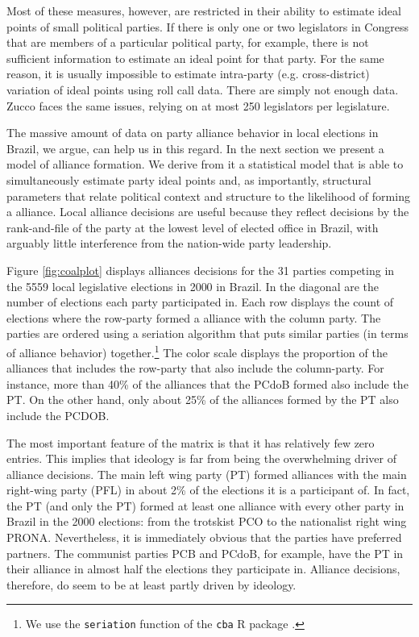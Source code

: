 Most of these measures, however, are restricted in their ability to estimate ideal points of small political parties. If there is only one or two legislators in Congress  that are members of a particular political party, for example, there is not sufficient information to estimate an ideal point for that party. For the same reason, it is usually impossible to estimate intra-party (e.g. cross-district) variation of ideal points using roll call data. There are simply not enough data. Zucco faces the same issues, relying on at most 250 legislators per legislature.  

The massive amount of data on party alliance behavior in local elections in Brazil, we argue, can  help us in this regard. In the next section we present a model of alliance formation. We   derive from it  a statistical model that is able to simultaneously estimate party ideal points and, as importantly, structural parameters that relate political context and structure to the likelihood of forming a alliance. Local alliance decisions are useful because  they reflect decisions by the rank-and-file of the party at  the lowest level of elected office in Brazil,  with arguably little interference from the nation-wide party leadership.

Figure \ref{fig:coalplot}  displays alliances decisions for the 31 parties competing in the 5559 local legislative elections in 2000 in Brazil. In the diagonal are the number of elections each party participated in. Each row displays the count of elections where the row-party formed a alliance with the column party. The parties are ordered  using a seriation algorithm that puts similar parties (in terms of alliance behavior) together.\footnote{We use the \texttt{seriation} function of the \texttt{cba} R package \cite{buchta:2006}.} The color scale displays the proportion of the alliances that includes the row-party that also include the column-party. For instance, more than 40\% of the alliances that the PCdoB formed also include the PT. On the other hand, only about 25\% of  the alliances formed by the PT also include the PCDOB.


The most important feature of the matrix is that it has relatively few zero entries. This  implies that ideology is far from being the overwhelming driver of alliance decisions. The main left wing party (PT)  formed alliances with the main right-wing party (PFL) in about 2\% of the elections it is a participant of. In fact, the PT (and only the PT)  formed at least one alliance with every other party in Brazil in the 2000 elections: from the trotskist  PCO  to the nationalist right wing PRONA. Nevertheless, it is immediately obvious that the parties have preferred partners. The communist parties PCB and PCdoB, for example, have the PT in their alliance in almost half the elections they participate in.  Alliance decisions, therefore, do seem to be  at least partly  driven by ideology. 
   
